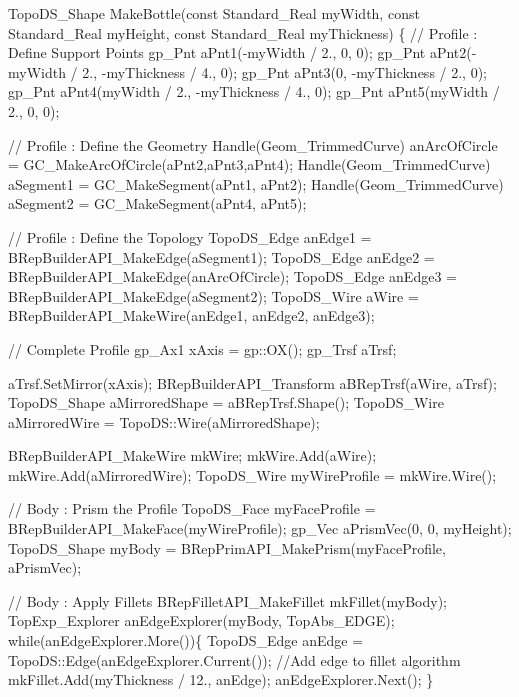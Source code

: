 \begin{DoxyCode}
TopoDS\_Shape MakeBottle(\textcolor{keyword}{const} Standard\_Real myWidth, \textcolor{keyword}{const} Standard\_Real myHeight,
                        \textcolor{keyword}{const} Standard\_Real myThickness)
\{
    \textcolor{comment}{// Profile : Define Support Points}
    gp\_Pnt aPnt1(-myWidth / 2., 0, 0);        
    gp\_Pnt aPnt2(-myWidth / 2., -myThickness / 4., 0);
    gp\_Pnt aPnt3(0, -myThickness / 2., 0);
    gp\_Pnt aPnt4(myWidth / 2., -myThickness / 4., 0);
    gp\_Pnt aPnt5(myWidth / 2., 0, 0);

    \textcolor{comment}{// Profile : Define the Geometry}
    Handle(Geom\_TrimmedCurve) anArcOfCircle = GC\_MakeArcOfCircle(aPnt2,aPnt3,aPnt4);
    Handle(Geom\_TrimmedCurve) aSegment1 = GC\_MakeSegment(aPnt1, aPnt2);
    Handle(Geom\_TrimmedCurve) aSegment2 = GC\_MakeSegment(aPnt4, aPnt5);

    \textcolor{comment}{// Profile : Define the Topology}
    TopoDS\_Edge anEdge1 = BRepBuilderAPI\_MakeEdge(aSegment1);
    TopoDS\_Edge anEdge2 = BRepBuilderAPI\_MakeEdge(anArcOfCircle);
    TopoDS\_Edge anEdge3 = BRepBuilderAPI\_MakeEdge(aSegment2);
    TopoDS\_Wire aWire  = BRepBuilderAPI\_MakeWire(anEdge1, anEdge2, anEdge3);

    \textcolor{comment}{// Complete Profile}
    gp\_Ax1 xAxis = gp::OX();
    gp\_Trsf aTrsf;

    aTrsf.SetMirror(xAxis);
    BRepBuilderAPI\_Transform aBRepTrsf(aWire, aTrsf);
    TopoDS\_Shape aMirroredShape = aBRepTrsf.Shape();
    TopoDS\_Wire aMirroredWire = TopoDS::Wire(aMirroredShape);

    BRepBuilderAPI\_MakeWire mkWire;
    mkWire.Add(aWire);
    mkWire.Add(aMirroredWire);
    TopoDS\_Wire myWireProfile = mkWire.Wire();

    \textcolor{comment}{// Body : Prism the Profile}
    TopoDS\_Face myFaceProfile = BRepBuilderAPI\_MakeFace(myWireProfile);
    gp\_Vec aPrismVec(0, 0, myHeight);
    TopoDS\_Shape myBody = BRepPrimAPI\_MakePrism(myFaceProfile, aPrismVec);

    \textcolor{comment}{// Body : Apply Fillets}
    BRepFilletAPI\_MakeFillet mkFillet(myBody);
    TopExp\_Explorer anEdgeExplorer(myBody, TopAbs\_EDGE);
    \textcolor{keywordflow}{while}(anEdgeExplorer.More())\{
        TopoDS\_Edge anEdge = TopoDS::Edge(anEdgeExplorer.Current());
        \textcolor{comment}{//Add edge to fillet algorithm}
        mkFillet.Add(myThickness / 12., anEdge);
        anEdgeExplorer.Next();
    \}


\end{DoxyCode}
